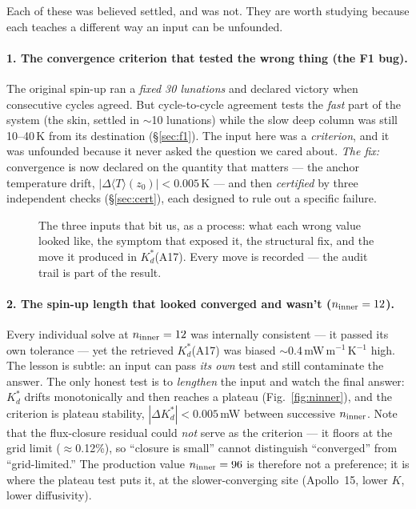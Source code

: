 \documentclass[11pt]{report}
\newcommand{\Tm}{\langle T\rangle}
\begin{document}
Each of these was believed settled, and was not. They are worth studying
because each teaches a different way an input can be unfounded.

\paragraph{\textbf{1. The convergence criterion that tested the wrong thing
(the F1 bug).}} The original spin-up ran a \emph{fixed 30 lunations} and
declared victory when consecutive cycles agreed. But cycle-to-cycle agreement
tests the \emph{fast} part of the system (the skin, settled in $\sim$10
lunations) while the slow deep column was still 10--40\,K from its
destination (\S\ref{sec:f1}). The input here was a \emph{criterion}, and it
was unfounded because it never asked the question we cared about.
\emph{The fix:} convergence is now declared on the quantity that matters ---
the anchor temperature drift, $|\Delta\Tm(z_0)|<0.005$\,K --- and then
\emph{certified} by three independent checks (\S\ref{sec:cert}), each designed
to rule out a specific failure.

\begin{figure}[htbp]\centering

\caption{The three inputs that bit us, as a process: what each wrong value
looked like, the symptom that exposed it, the structural fix, and the move
it produced in $K_d^{*}$(A17). Every move is recorded --- the audit trail
is part of the result.}
\label{fig:threebugs}
\end{figure}

\paragraph{\textbf{2. The spin-up length that looked converged and wasn't
($n_{\rm inner}=12$).}} Every individual solve at $n_{\rm inner}=12$ was
internally consistent --- it passed its own tolerance --- yet the retrieved
$K_d^{*}$(A17) was biased $\sim$0.4\,mW\,m$^{-1}$\,K$^{-1}$ high. The lesson is
subtle: an input can pass \emph{its own} test and still contaminate the answer.
The only honest test is to \emph{lengthen} the input and watch the final answer:
$K_d^{*}$ drifts monotonically and then reaches a plateau
(Fig.~\ref{fig:ninner}), and the criterion is plateau stability,
$|\Delta K_d^{*}|<0.005$\,mW between successive $n_{\rm inner}$. Note that the
flux-closure residual could \emph{not} serve as the criterion --- it floors at
the grid limit ($\approx$0.12\%), so ``closure is small'' cannot distinguish
``converged'' from ``grid-limited.'' The production value $n_{\rm inner}=96$ is
therefore not a preference; it is where the plateau test puts it, at the
slower-converging site (Apollo~15, lower $K$, lower diffusivity).
\end{document}
